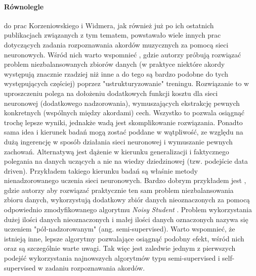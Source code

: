 \paragraph{Równolegle} do prac Korzeniowskiego i Widmera, jak również już po ich ostatnich
publikacjach związanych z tym tematem, powstawało wiele innych prac dotyczących zadania
rozpoznawania akordów muzycznych za pomocą sieci neuronowych. Wśród nich warto wspomnieć
\cite{mcfee_structured_2017}, gdzie autorzy próbują rozwiązać problem niezbalansowanych zbiorów
danych (w praktyce niektóre akordy występują znacznie rzadziej niż inne a do tego są bardzo podobne
do tych występujących częściej) poprzez "ustrukturyzowanie" treningu. Rozwiązanie to w uproszczeniu
polega na dołożeniu dodatkowych funkcji kosztu dla sieci neuronowej (dodatkowego nadzorowania),
wymuszających ekstrakcję pewnych konkretnych (wspólnych między akordami) cech. Wszystko to pozwala
osiągnąć trochę lepsze wyniki, jednakże wadą jest skomplikowanie rozwiązania. Ponadto sama idea i
kierunek badań mogą zostać poddane w wątpliwość, ze względu na dużą ingerencję w sposób działania
sieci neuronowej i wymuszanie pewnych zachowań. Alternatywą jest dążenie w kierunku generalizacji i
faktycznego polegania na danych uczących a nie na wiedzy dziedzinowej (tzw. podejście data driven).
Przykładem takiego kierunku badań są właśnie metody nienadzorowanego uczenia sieci neuronowych.
Bardzo dobrym przykładem jest \cite{bortolozzo_improving_2021}, gdzie autorzy aby rozwiązać
praktycznie ten sam problem niezbalansowania zbioru danych, wykorzystują dodatkowy zbiór danych
nieoznaczonych za pomocą odpowiednio zmodyfikowanego algorytmu \emph{Noisy Student}
\cite{xie_self-training_2020}. Problem wykorzystania dużej ilości danych nieoznaczonych i małej
ilości danych oznaczonych nazywa się uczeniem "pół-nadzorowanym" (ang. semi-supervised). Warto
wspomnieć, że istnieją inne, lepsze algorytmy pozwalające osiągnąć podobny efekt, wśród nich
\cite{pham_meta_2021} oraz \cite{chen_big_2020} są szczególnie warte uwagi. Tak więc
\cite{bortolozzo_improving_2021} jest zaledwie jednym z pierwszych podejść wykorzystania najnowszych
algorytmów typu semi-supervised i self-supervised w zadaniu rozpoznawania akordów.


